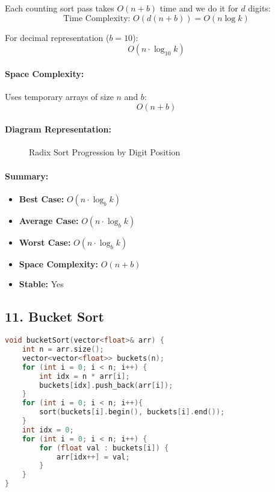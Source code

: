 Each counting sort pass takes \( O(n + b) \) time and we do it for \( d \) digits:
\[
\boxed{\text{Time Complexity: } O(d(n + b)) = O(n \log k)}
\]

For decimal representation (\( b = 10 \)):
\[
\boxed{O(n \cdot \log_{10} k)}
\]

\paragraph{Space Complexity:}
Uses temporary arrays of size \( n \) and \( b \):
\[
\boxed{O(n + b)}
\]

\paragraph{Diagram Representation:}

\begin{figure}[H]
\centering
{}
\caption{Radix Sort Progression by Digit Position}
\end{figure}

\paragraph{Summary:}
\begin{itemize}
  \item \textbf{Best Case:} \( O(n \cdot \log_{b} k) \)
  \item \textbf{Average Case:} \( O(n \cdot \log_{b} k) \)
  \item \textbf{Worst Case:} \( O(n \cdot \log_{b} k) \)
  \item \textbf{Space Complexity:} \( O(n + b) \)
  \item \textbf{Stable:} Yes
\end{itemize}

\subsection*{\textbf{11. Bucket Sort}}
\begin{lstlisting}[language=C++, caption=Bucket Sort (Float numbers between 0 and 1)]
void bucketSort(vector<float>& arr) {
    int n = arr.size();
    vector<vector<float>> buckets(n);
    for (int i = 0; i < n; i++) {
        int idx = n * arr[i];
        buckets[idx].push_back(arr[i]);
    }
    for (int i = 0; i < n; i++){
        sort(buckets[i].begin(), buckets[i].end());
    }
    int idx = 0;
    for (int i = 0; i < n; i++) {
        for (float val : buckets[i]) {
            arr[idx++] = val;
        }
    }
}
\end{lstlisting}

